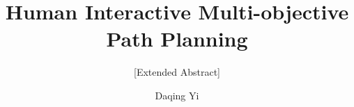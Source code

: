 \documentclass{acm_proc_article-sp}
\begin{document}
\title{Human Interactive Multi-objective Path Planning}
\subtitle{[Extended Abstract]
}

\author{
\alignauthor
Daqing Yi \\%
       \\
       \\
}

\date{}

\maketitle
\begin{abstract}
\end{abstract}
\end{document}
